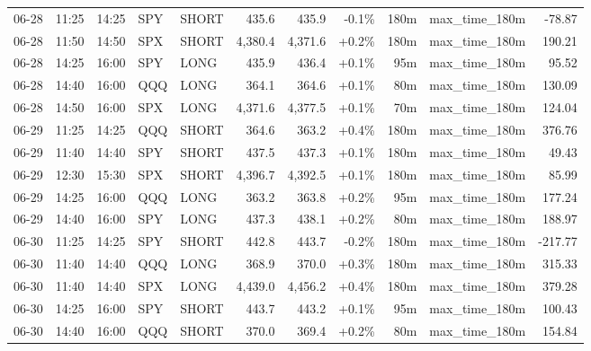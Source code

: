 \documentclass[11pt,a4paper,twoside]{article}
\begin{document}
\begin{center}
\begin{longtable}{>{\color{txtmain}}l l l l l r r r r >{\color{txtmain}}l r}
06-28 & 11:25 & 14:25 & SPY & SHORT & 435.6 & 435.9 & \textcolor{lossred}{-0.1\%} & 180m & max\_time\_180m & \textcolor{lossred}{-78.87} \\
06-28 & 11:50 & 14:50 & SPX & SHORT & 4,380.4 & 4,371.6 & \textcolor{wingreen}{+0.2\%} & 180m & max\_time\_180m & \textcolor{wingreen}{190.21} \\
06-28 & 14:25 & 16:00 & SPY & LONG & 435.9 & 436.4 & \textcolor{wingreen}{+0.1\%} & 95m & max\_time\_180m & \textcolor{wingreen}{95.52} \\
06-28 & 14:40 & 16:00 & QQQ & LONG & 364.1 & 364.6 & \textcolor{wingreen}{+0.1\%} & 80m & max\_time\_180m & \textcolor{wingreen}{130.09} \\
06-28 & 14:50 & 16:00 & SPX & LONG & 4,371.6 & 4,377.5 & \textcolor{wingreen}{+0.1\%} & 70m & max\_time\_180m & \textcolor{wingreen}{124.04} \\
06-29 & 11:25 & 14:25 & QQQ & SHORT & 364.6 & 363.2 & \textcolor{wingreen}{+0.4\%} & 180m & max\_time\_180m & \textcolor{wingreen}{376.76} \\
06-29 & 11:40 & 14:40 & SPY & SHORT & 437.5 & 437.3 & \textcolor{wingreen}{+0.1\%} & 180m & max\_time\_180m & \textcolor{wingreen}{49.43} \\
06-29 & 12:30 & 15:30 & SPX & SHORT & 4,396.7 & 4,392.5 & \textcolor{wingreen}{+0.1\%} & 180m & max\_time\_180m & \textcolor{wingreen}{85.99} \\
06-29 & 14:25 & 16:00 & QQQ & LONG & 363.2 & 363.8 & \textcolor{wingreen}{+0.2\%} & 95m & max\_time\_180m & \textcolor{wingreen}{177.24} \\
06-29 & 14:40 & 16:00 & SPY & LONG & 437.3 & 438.1 & \textcolor{wingreen}{+0.2\%} & 80m & max\_time\_180m & \textcolor{wingreen}{188.97} \\
06-30 & 11:25 & 14:25 & SPY & SHORT & 442.8 & 443.7 & \textcolor{lossred}{-0.2\%} & 180m & max\_time\_180m & \textcolor{lossred}{-217.77} \\
06-30 & 11:40 & 14:40 & QQQ & LONG & 368.9 & 370.0 & \textcolor{wingreen}{+0.3\%} & 180m & max\_time\_180m & \textcolor{wingreen}{315.33} \\
06-30 & 11:40 & 14:40 & SPX & LONG & 4,439.0 & 4,456.2 & \textcolor{wingreen}{+0.4\%} & 180m & max\_time\_180m & \textcolor{wingreen}{379.28} \\
06-30 & 14:25 & 16:00 & SPY & SHORT & 443.7 & 443.2 & \textcolor{wingreen}{+0.1\%} & 95m & max\_time\_180m & \textcolor{wingreen}{100.43} \\
06-30 & 14:40 & 16:00 & QQQ & SHORT & 370.0 & 369.4 & \textcolor{wingreen}{+0.2\%} & 80m & max\_time\_180m & \textcolor{wingreen}{154.84} \\

\end{longtable}
\end{center}
\end{document}
